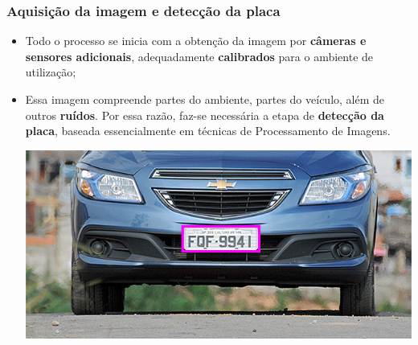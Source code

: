 \begin{frame}
	\frametitle{Aquisição da imagem e detecção da placa}
	\begin{itemize}
	\item	Todo o processo se inicia com a obtenção da imagem
	por \textbf{câmeras e sensores adicionais}, adequadamente
	\textbf{calibrados} para o ambiente de utilização;

	\item Essa imagem compreende partes do ambiente, partes do
	veículo, além de outros \textbf{ruídos}. Por essa razão,
	faz-se necessária a etapa de \textbf{detecção da placa},
	baseada essencialmente em técnicas de Processamento de 
	Imagens.
	
	\begin{center}
		\includegraphics[scale=0.3]{img/carplaterec.png}
	\end{center}

	\end{itemize}
\end{frame}

